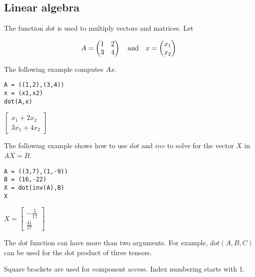
\subsection{Linear algebra}
The function $dot$ is used to multiply vectors and matrices.
Let

\[
A=\begin{pmatrix}1&2\\3&4\end{pmatrix}
\quad{\rm and}\quad x=\begin{pmatrix}x_1\\x_2\end{pmatrix}
\]

The following example computes $Ax$.

\begin{Verbatim}[formatcom=\color{blue},samepage=true]
A = ((1,2),(3,4))
x = (x1,x2)
dot(A,x)
\end{Verbatim}

$\displaystyle \begin{bmatrix}x_1+2x_2\\3x_1+4x_2\end{bmatrix}$

The following example shows how to use $dot$ and $inv$ to solve for
the vector $X$ in $AX=B$.

\begin{Verbatim}[formatcom=\color{blue},samepage=true]
A = ((3,7),(1,-9))
B = (16,-22)
X = dot(inv(A),B)
X
\end{Verbatim}

$\displaystyle X=\begin{bmatrix}-\frac{5}{17}\\ \frac{41}{17}\end{bmatrix}$


The $dot$ function can have more than two arguments.
For example, $dot(A,B,C)$ can be used for the dot product of three tensors.

Square brackets are used for component access.
Index numbering starts with 1.

